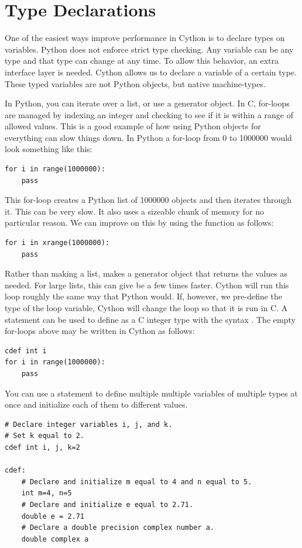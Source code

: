 \section*{Type Declarations}
One of the easiest ways improve performance in Cython is to declare types on variables.
Python does not enforce strict type checking.
Any variable can be any type and that type can change at any time.
To allow this behavior, an extra interface layer is needed.
Cython allows us to declare a variable of a certain type.
These typed variables are not Python objects, but native machine-types.

In Python, you can iterate over a list, or use a generator object.
In C, for-loops are managed by indexing an integer and checking to see if it is within a range of allowed values.
This is a good example of how using Python objects for everything can slow things down.
In Python a for-loop from 0 to 1000000 would look something like this:
\begin{lstlisting}
for i in range(1000000):
    pass
\end{lstlisting}
This for-loop creates a Python list of 1000000 objects and then iterates through it.
This can  be very slow.
It also uses a sizeable chunk of memory for no particular reason.
We can improve on this by using the  function as follows:
\begin{lstlisting}
for i in xrange(1000000):
    pass
\end{lstlisting}

Rather than making a list,  makes a generator object that returns the values as needed.
For large lists, this can give be a few times faster.
Cython will run this loop roughly the same way that Python would.
If, however, we pre-define the type of the loop variable, Cython will change the loop so that it is run in C.
A  statement can be used to define  as a C integer type with the syntax .
The empty for-loops above may be written in Cython as follows:
\begin{lstlisting}
cdef int i
for i in range(1000000):
    pass
\end{lstlisting}
You can use a  statement to define multiple multiple variables of multiple types at once and initialize each of them to different values.
\begin{lstlisting}
# Declare integer variables i, j, and k.
# Set k equal to 2.
cdef int i, j, k=2

cdef:
    # Declare and initialize m equal to 4 and n equal to 5.
    int m=4, n=5
    # Declare and initialize e equal to 2.71.
    double e = 2.71
    # Declare a double precision complex number a.
    double complex a
\end{lstlisting}

